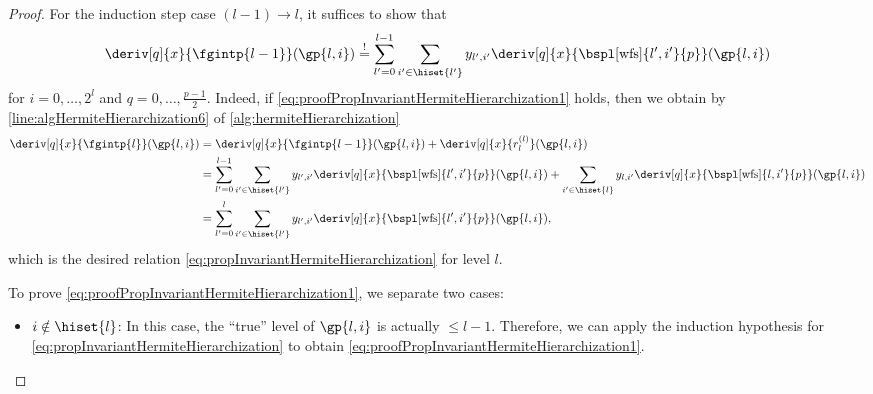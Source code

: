 \begin{proof}
  For the induction step case $(l-1) \to l$,
  it suffices to show that
  \begin{equation}
    \label{eq:proofPropInvariantHermiteHierarchization1}
    \deriv[q]{x}{\fgintp{l-1}}(\gp{l,i})
    \overset{!}{=} \sum_{l'=0}^{l-1} \sum_{i' \in \hiset{l'}}
    \linout{l',i'} \deriv[q]{x}{\bspl[\wfs]{l',i'}{p}}(\gp{l,i})
  \end{equation}
  for $i = 0, \dotsc, 2^l$ and $q = 0, \dotsc, \frac{p-1}{2}$.
  Indeed, if \eqref{eq:proofPropInvariantHermiteHierarchization1} holds,
  then we obtain by \cref{line:algHermiteHierarchization6}
  of \cref{alg:hermiteHierarchization}
  \begin{subequations}
    \begin{align}
      \deriv[q]{x}{\fgintp{l}}(\gp{l,i})
      &= \deriv[q]{x}{\fgintp{l-1}}(\gp{l,i}) +
      \deriv[q]{x}{r^{(l)}_l}(\gp{l,i})\\
      &= \sum_{l'=0}^{l-1} \sum_{i' \in \hiset{l'}}
      \linout{l',i'} \deriv[q]{x}{\bspl[\wfs]{l',i'}{p}}(\gp{l,i}) +
      \sum_{i' \in \hiset{l}}
      \linout{l,i'} \deriv[q]{x}{\bspl[\wfs]{l,i'}{p}}(\gp{l,i})\\
      &= \sum_{l'=0}^l \sum_{i' \in \hiset{l'}}
      \linout{l',i'} \deriv[q]{x}{\bspl[\wfs]{l',i'}{p}}(\gp{l,i}),
    \end{align}
  \end{subequations}
  which is the desired relation
  \eqref{eq:propInvariantHermiteHierarchization}
  for level $l$.
  
  To prove \eqref{eq:proofPropInvariantHermiteHierarchization1},
  we separate two cases:
  \begin{itemize}
    \item
    ${i \notin \hiset{l}}$:
    In this case, the ``true'' level of $\gp{l,i}$ is actually $\le l - 1$.
    Therefore, we can apply the induction hypothesis
    for \cref{eq:propInvariantHermiteHierarchization} to
    obtain \eqref{eq:proofPropInvariantHermiteHierarchization1}.
    

\end{itemize}
\end{proof}
